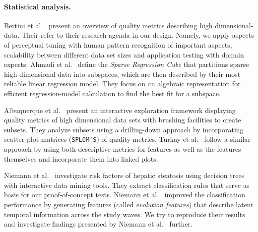 \documentclass[journal]{style/vgtc} 			          %
\begin{document}
\paragraph{Statistical analysis.}
Bertini et al.~\cite{Bertini} present an overview of quality metrics describing high dimensional-data.
Their refer to their research agenda in our design.
Namely, we apply aspects of perceptual tuning with human pattern recognition of important aspects, scalability between different data set sizes and application testing with domain experts.
Ahmadi et al.~\cite{Ahmadi} define the \emph{Sparse Regression Cube} that partitions sparse high dimensional data into subspaces, which are then described by their most reliable linear regression model.
They focus on an algebraic representation for efficient regression-model calculation to find the best fit for a subspace.

Albuquerque et al.~\cite{Albuquerque} present an interactive exploration framework displaying quality metrics of high dimensional data sets with brushing facilities to create subsets.
They analyze subsets using a drilling-down approach by incorporating scatter plot matrices (\texttt{SPLOM'S}) of quality metrics. %
Turkay et al.~\cite{Turkay} follow a similar approach by using both descriptive metrics for features as well as the features themselves and incorporate them into linked plots.

Niemann et al.~\cite{Niemann2014} investigate risk factors of hepatic steatosis using decision trees with interactive data mining tools.
They extract classification rules that serve as basis for our proof-of-concept tests.
Niemann et al.~\cite{Niemann2015} improved the classification performance by generating features (called \emph{evolution features}) that describe latent temporal information across the study waves.
We try to reproduce their results and investigate findings presented by Niemann et al.~\cite{Niemann2014} further.
\end{document}
